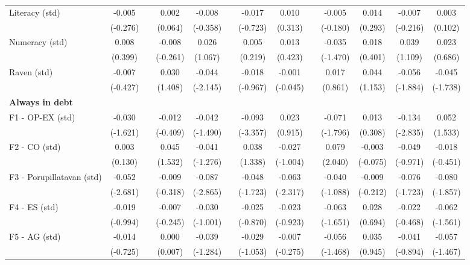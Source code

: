 \begin{table}[htbp]
{\begin{tabular}{lcccccccccccc}
    Literacy (std) & -0.005 &   & 0.002 & -0.008 &   & -0.017 & 0.010 &   & -0.005 & 0.014 & -0.007 & 0.003 \\
      & (-0.276) &   & (0.064) & (-0.358) &   & (-0.723) & (0.313) &   & (-0.180) & (0.293) & (-0.216) & (0.102) \\
    Numeracy (std) & 0.008 &   & -0.008 & 0.026 &   & 0.005 & 0.013 &   & -0.035 & 0.018 & 0.039 & 0.023 \\
      & (0.399) &   & (-0.261) & (1.067) &   & (0.219) & (0.423) &   & (-1.470) & (0.401) & (1.109) & (0.686) \\
    Raven (std) & -0.007 &   & 0.030 & -0.044 &   & -0.018 & -0.001 &   & 0.017 & 0.044 & -0.056 & -0.045 \\
      & (-0.427) &   & (1.408) & (-2.145) &   & (-0.967) & (-0.045) &   & (0.861) & (1.153) & (-1.884) & (-1.738) \\
    \midrule
    \textbf{Always in debt} &       &       &       &       &       &       &       &       &       &       &       &  \\
    F1 - OP-EX (std) & -0.030 &   & -0.012 & -0.042 &   & -0.093 & 0.023 &   & -0.071 & 0.013 & -0.134 & 0.052 \\
      & (-1.621) &   & (-0.409) & (-1.490) &   & (-3.357) & (0.915) &   & (-1.796) & (0.308) & (-2.835) & (1.533) \\
    F2 - CO (std) & 0.003 &   & 0.045 & -0.041 &   & 0.038 & -0.027 &   & 0.079 & -0.003 & -0.049 & -0.018 \\
      & (0.130) &   & (1.532) & (-1.276) &   & (1.338) & (-1.004) &   & (2.040) & (-0.075) & (-0.971) & (-0.451) \\
    F3 - Porupillatavan (std) & -0.052 &   & -0.009 & -0.087 &   & -0.048 & -0.063 &   & -0.040 & -0.009 & -0.076 & -0.080 \\
      & (-2.681) &   & (-0.318) & (-2.865) &   & (-1.723) & (-2.317) &   & (-1.088) & (-0.212) & (-1.723) & (-1.857) \\
    F4 - ES (std) & -0.019 &   & -0.007 & -0.030 &   & -0.025 & -0.023 &   & -0.063 & 0.028 & -0.022 & -0.062 \\
      & (-0.994) &   & (-0.245) & (-1.001) &   & (-0.870) & (-0.923) &   & (-1.651) & (0.694) & (-0.468) & (-1.561) \\
    F5 - AG (std) & -0.014 &   & 0.000 & -0.039 &   & -0.029 & -0.007 &   & -0.056 & 0.035 & -0.041 & -0.057 \\
      & (-0.725) &   & (0.007) & (-1.284) &   & (-1.053) & (-0.275) &   & (-1.468) & (0.945) & (-0.894) & (-1.467) \\

\end{tabular}}
\end{table}
